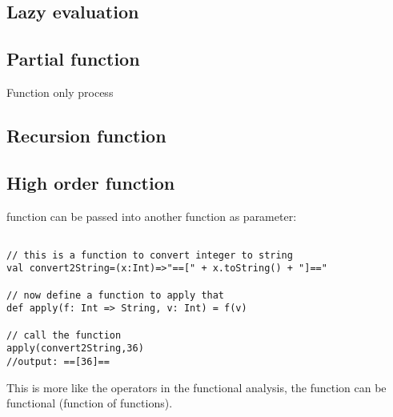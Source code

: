 \documentclass[notheorems, aspectratio=54]{beamer}
\begin{document}
\subsection{Lazy evaluation}
\begin{frame}[fragile]

  
\end{frame}

\subsection{Partial function }
\begin{frame}[fragile]

Function only process 
  
\end{frame}


\subsection{Recursion function}
\begin{frame}[fragile]

  
\end{frame}

\begin{frame}[fragile]

  
\end{frame}

\subsection{High order function}
\begin{frame}[fragile]

function can be passed into another function as parameter:
\begin{verbatim}

// this is a function to convert integer to string
val convert2String=(x:Int)=>"==[" + x.toString() + "]=="

// now define a function to apply that
def apply(f: Int => String, v: Int) = f(v)

// call the function
apply(convert2String,36)
//output: ==[36]== 
\end{verbatim}
This is more like the operators in the functional analysis, the function
can be functional (function of functions).

  
\end{frame}
\end{document}
